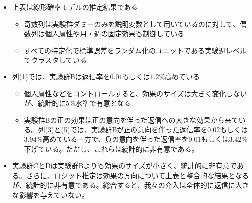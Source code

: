 \documentclass[
  a4paperpaper,
]{article}
\providecommand{\tightlist}{%
  \setlength{\itemsep}{0pt}\setlength{\parskip}{0pt}}\usepackage{longtable,booktabs,array}
\begin{document}
\begin{itemize}
\tightlist
\item
  上表は線形確率モデルの推定結果である

  \begin{itemize}
  \tightlist
  \item
    奇数列は実験群ダミーのみを説明変数として用いているのに対して、偶数列は個人属性や月・週の固定効果も制御している
  \item
    すべての特定化で標準誤差をランダム化のユニットである実験週レベルでクラスタしている
  \end{itemize}
\item
  列(1)では、実験群Bは返信率を\(0.01\)もしくは\(1.2\)\%高めている

  \begin{itemize}
  \tightlist
  \item
    個人属性などをコントロールすると、効果のサイズは大きく変化しないが、統計的に5\%水準で有意となる
  \item
    実験群Bの正の効果は正の意向を伴った返信への大きな効果から来ている。列(3)と(5)では、実験群Bが正の意向を伴った返信率を\(0.02\)もしくは\(3.94\)\%高めている一方で、負の意向を伴った返信率を\(0.01\)もしくは\(3.42\)\%下げている。ただし、これらは統計的に非有意である。
  \end{itemize}
\item
  実験群CとDは実験群Bよりも効果のサイズが小さく、統計的に非有意である。さらに、ロジット推定は効果の方向について上表と整合的な結果となるが、統計的に非有意である。総合すると、我々の介入は全体的に返信に大きな影響を与えていない。
\end{itemize}
\end{document}
